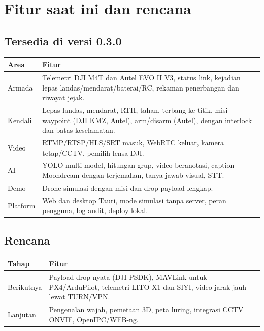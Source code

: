 \chapter{Fitur saat ini dan rencana}
\section{Tersedia di versi 0.3.0}

\noindent\begin{tabularx}{\linewidth}{@{}l X@{}}
\toprule
Area & Fitur \\ \midrule
Armada & Telemetri DJI M4T dan Autel EVO II V3, status link, kejadian lepas landas/mendarat/baterai/RC, rekaman penerbangan dan riwayat jejak. \\
Kendali & Lepas landas, mendarat, RTH, tahan, terbang ke titik, misi waypoint (DJI KMZ, Autel), arm/disarm (Autel), dengan interlock dan batas keselamatan. \\
Video & RTMP/RTSP/HLS/SRT masuk, WebRTC keluar, kamera tetap/CCTV, pemilih lensa DJI. \\
AI & YOLO multi-model, hitungan grup, video beranotasi, caption Moondream dengan terjemahan, tanya-jawab visual, STT. \\
Demo & Drone simulasi dengan misi dan drop payload lengkap. \\
Platform & Web dan desktop Tauri, mode simulasi tanpa server, peran pengguna, log audit, deploy lokal. \\
\bottomrule
\end{tabularx}

\section{Rencana}

\noindent\begin{tabularx}{\linewidth}{@{}l X@{}}
\toprule
Tahap & Fitur \\ \midrule
Berikutnya & Payload drop nyata (DJI PSDK), MAVLink untuk PX4/ArduPilot, telemetri LITO X1 dan SIYI, video jarak jauh lewat TURN/VPN. \\
Lanjutan & Pengenalan wajah, pemetaan 3D, peta luring, integrasi CCTV ONVIF, OpenIPC/WFB-ng. \\
\bottomrule
\end{tabularx}

